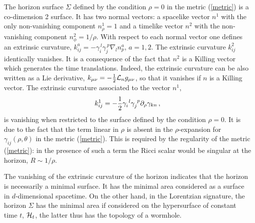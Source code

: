 \documentclass[12pt]{article}
\def\be{\begin{eqnarray}}
\def\ee{\end{eqnarray}}
\def\lb{\label}
\def\o{\over}
\begin{document}
The horizon surface $\Sigma$ defined by the condition $\rho=0$ in the metric (\ref{metric}) is a co-dimension 2 surface. It has two normal vectors: a spacelike vector $n^1$ with the only non-vanishing component $n^1_\rho=1$
and a timelike vector $n^2$ with the non-vanishing component $n^2_\phi=1/\rho$. With respect to each normal vector 
one defines an extrinsic curvature, $k_{ij}^a=-\gamma_{i}^{\ l}\gamma_j^{\ p}\nabla_l n^a_p$, $a=1,2$. The extrinsic curvature $k^2_{ij}$ identically vanishes. It is a consequence of the fact that $n^2$ is a Killing vector which generates the time translations. Indeed, the extrinsic curvature can be also written as a Lie derivative, $k_{\mu\nu}=-{1\o 2}{\cal  L}_n g_{\mu\nu}$, so that it vanishes if $n$ is a Killing vector. The extrinsic curvature associated to the vector $n^1$, 
\be
k^1_{ij}=-{1\o 2}\gamma_{i}^{\ l}\gamma_j^{\ p}\partial_\rho\gamma_{kn}\, ,
\lb{extrinsic curvature static}
\ee
is  vanishing when restricted to the surface defined by the condition $\rho=0$. It is due  to the fact that the term linear in $\rho$ is absent in the $\rho$-expansion
for $\gamma_{ij}(\rho,\theta)$ in the metric (\ref{metric}). This is required by the regularity of the metric (\ref{metric}): in the presence of such a term  the Ricci scalar would be singular at the horizon,  $R\sim 1/\rho$. 

 
The vanishing of the extrinsic curvature of the horizon   indicates that the horizon is necessarily a minimal surface. It has the minimal area considered as a surface in $d$-dimensional spacetime.  On the other hand, in the Lorentzian signature, the horizon $\Sigma$ has the minimal area if considered on the hypersurface of constant time $t$, ${\cal H}_t$, the latter thus has the topology of a wormhole.
 
 
 
\end{document}
